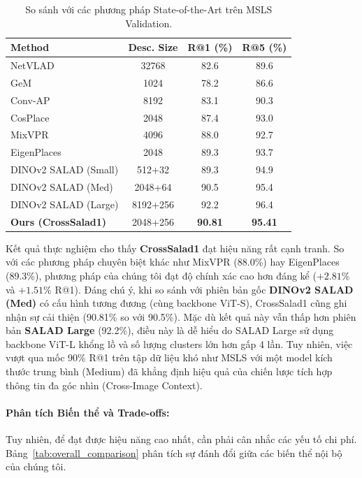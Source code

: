 \documentclass[12pt,a4paper]{article}
\begin{document}
    \begin{table}[h]
    \centering
    \caption{So sánh với các phương pháp State-of-the-Art trên MSLS Validation.}
    \label{tab:sota_comparison}
    \small
    \begin{tabular}{@{}lccc@{}}
    \toprule
    \textbf{Method} & \textbf{Desc. Size} & \textbf{R@1 (\%)} & \textbf{R@5 (\%)} \\
    \midrule
    NetVLAD \cite{arandjelovic2016netvlad} & 32768 & 82.6 & 89.6 \\
    GeM \cite{radenovic2018fine} & 1024 & 78.2 & 86.6 \\
    Conv-AP \cite{alibey2022gsv} & 8192 & 83.1 & 90.3 \\
    CosPlace \cite{berton2022rethinking} & 2048 & 87.4 & 93.0 \\
    MixVPR \cite{alibey2023mixvpr} & 4096 & 88.0 & 92.7 \\
    EigenPlaces \cite{berton2023eigenplaces} & 2048 & 89.3 & 93.7 \\
    DINOv2 SALAD (Small) \cite{izquierdo2024salad} & 512+32 & 89.3 & 94.9 \\
    DINOv2 SALAD (Med) \cite{izquierdo2024salad} & 2048+64 & 90.5 & 95.4 \\
    DINOv2 SALAD (Large) \cite{izquierdo2024salad} & 8192+256 & 92.2 & 96.4 \\
    \midrule
    \textbf{Ours (CrossSalad1)} & 2048+256 & \textbf{90.81} & \textbf{95.41} \\
    \bottomrule
    \end{tabular}
    \end{table}

    Kết quả thực nghiệm cho thấy \textbf{CrossSalad1} đạt hiệu năng rất cạnh tranh. So với các phương pháp chuyên biệt khác như MixVPR (88.0\%) hay EigenPlaces (89.3\%), phương pháp của chúng tôi đạt độ chính xác cao hơn đáng kể ($+2.81\%$ và $+1.51\%$ R@1). Đáng chú ý, khi so sánh với phiên bản gốc \textbf{DINOv2 SALAD (Med)} có cấu hình tương đương (cùng backbone ViT-S), CrossSalad1 cũng ghi nhận sự cải thiện (90.81\% so với 90.5\%). Mặc dù kết quả này vẫn thấp hơn phiên bản \textbf{SALAD Large} (92.2\%), điều này là dễ hiểu do SALAD Large sử dụng backbone ViT-L khổng lồ và số lượng clusters lớn hơn gấp 4 lần. Tuy nhiên, việc vượt qua mốc 90\% R@1 trên tập dữ liệu khó như MSLS với một model kích thước trung bình (Medium) đã khẳng định hiệu quả của chiến lược tích hợp thông tin đa góc nhìn (Cross-Image Context).

    \paragraph{Phân tích Biến thể và Trade-offs:}
    Tuy nhiên, để đạt được hiệu năng cao nhất, cần phải cân nhắc các yếu tố chi phí. Bảng~\ref{tab:overall_comparison} phân tích sự đánh đổi giữa các biến thể nội bộ của chúng tôi.
\end{document}
